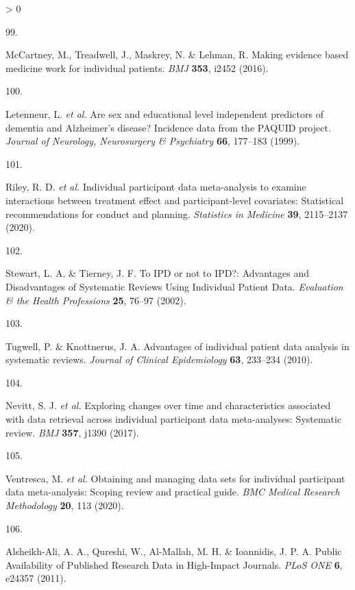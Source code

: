 \documentclass[a4paper, twoside]{templates/ociamthesis}
\newlength{\cslhangindent}
\newlength{\csllabelwidth}
\newenvironment{CSLReferences}[3] %
 {%
  \setlength{\parindent}{0pt}
  \ifodd #1 \everypar{\setlength{\hangindent}{\cslhangindent}}\ignorespaces\fi
  \ifnum #2 > 0
  \setlength{\parskip}{#2\baselineskip}
  \fi
 }%
 {}
\newcommand{\CSLLeftMargin}[1]{\parbox[t]{\maxof{\widthof{#1}}{\csllabelwidth}}{#1}}
\newcommand{\CSLRightInline}[1]{\parbox[t]{\linewidth - \csllabelwidth}{#1}}
\begin{document}
\begin{CSLReferences}{0}{0}
\leavevmode\hypertarget{ref-mccartney2016}{}%
\CSLLeftMargin{99. }
\CSLRightInline{McCartney, M., Treadwell, J., Maskrey, N. \& Lehman, R. Making evidence based medicine work for individual patients. \emph{BMJ} \textbf{353}, i2452 (2016).}

\leavevmode\hypertarget{ref-letenneur1999}{}%
\CSLLeftMargin{100. }
\CSLRightInline{Letenneur, L. \emph{et al.} Are sex and educational level independent predictors of dementia and {Alzheimer}'s disease? Incidence data from the {PAQUID} project. \emph{Journal of Neurology, Neurosurgery \& Psychiatry} \textbf{66}, 177--183 (1999).}

\leavevmode\hypertarget{ref-riley2020}{}%
\CSLLeftMargin{101. }
\CSLRightInline{Riley, R. D. \emph{et al.} Individual participant data meta-analysis to examine interactions between treatment effect and participant-level covariates: Statistical recommendations for conduct and planning. \emph{Statistics in Medicine} \textbf{39}, 2115--2137 (2020).}

\leavevmode\hypertarget{ref-stewart2002}{}%
\CSLLeftMargin{102. }
\CSLRightInline{Stewart, L. A. \& Tierney, J. F. To {IPD} or not to {IPD}?: Advantages and {Disadvantages} of {Systematic Reviews Using Individual Patient Data}. \emph{Evaluation \& the Health Professions} \textbf{25}, 76--97 (2002).}

\leavevmode\hypertarget{ref-tugwell2010}{}%
\CSLLeftMargin{103. }
\CSLRightInline{Tugwell, P. \& Knottnerus, J. A. Advantages of individual patient data analysis in systematic reviews. \emph{Journal of Clinical Epidemiology} \textbf{63}, 233--234 (2010).}

\leavevmode\hypertarget{ref-nevitt2017}{}%
\CSLLeftMargin{104. }
\CSLRightInline{Nevitt, S. J. \emph{et al.} Exploring changes over time and characteristics associated with data retrieval across individual participant data meta-analyses: Systematic review. \emph{BMJ} \textbf{357}, j1390 (2017).}

\leavevmode\hypertarget{ref-ventresca2020}{}%
\CSLLeftMargin{105. }
\CSLRightInline{Ventresca, M. \emph{et al.} Obtaining and managing data sets for individual participant data meta-analysis: Scoping review and practical guide. \emph{BMC Medical Research Methodology} \textbf{20}, 113 (2020).}

\leavevmode\hypertarget{ref-alsheikh-ali2011}{}%
\CSLLeftMargin{106. }
\CSLRightInline{Alsheikh-Ali, A. A., Qureshi, W., Al-Mallah, M. H. \& Ioannidis, J. P. A. Public {Availability} of {Published Research Data} in {High}-{Impact Journals}. \emph{PLoS ONE} \textbf{6}, e24357 (2011).}


\end{CSLReferences}
\end{document}
